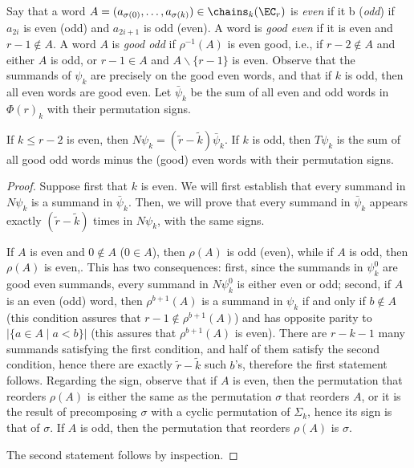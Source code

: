 Say that a word $A = (a_{\sigma(0)},\ldots,a_{\sigma(k)})\in \chains_k(\EC_r)$ is \emph{even} if it b (\emph{odd}) if $a_{2i}$ is even (odd) and $a_{2i+1}$ is odd (even). A word is \emph{good even} if it is even and $r-1\notin A$. A word $A$ is \emph{good odd} if $\rho^{-1}(A)$ is even good, i.e., if $r-2\notin A$ and either $A$ is odd, or $r-1\in A$ and $A\smallsetminus \{r-1\}$ is even. Observe that the summands of $\psi_k$ are precisely on the good even words, and that if $k$ is odd, then all even words are good even. Let $\bar{\psi}_k$ be the sum of all even and odd words in $\Phi(r)_k$ with their permutation signs.

\begin{lemma} \label{lemma:simp}
	If $k\leq r-2$ is even, then $N\psi_k = (\tilde{r}-\tilde{k})\bar{\psi}_k$. If $k$ is odd, then $T\psi_k$ is the sum of all good odd words minus the (good) even words with their permutation signs.
\end{lemma}

\begin{proof}
	Suppose first that $k$ is even. We will first establish that every summand in $N\psi_k$ is a summand in $\bar{\psi}_k$. Then, we will prove that every summand in $\bar{\psi}_k$ appears exactly $(\tilde{r}-\tilde{k})$ times in $N\psi_k$, with the same signs.

	If $A$ is even and $0\notin A$ ($0\in A$), then $\rho(A)$ is odd (even), while if $A$ is odd, then $\rho(A)$ is even,. This has two consequences: first, since the summands in $\psi_k^0$ are good even summands, every summand in $N\psi_k^0$ is either even or odd; second, if $A$ is an even (odd) word, then $\rho^{b+1}(A)$ is a summand in $\psi_k$ if and only if $b\notin A$ (this condition assures that $r-1\notin \rho^{b+1}(A)$) and has opposite parity to $|\{a\in A\mid a<b\}|$ (this assures that $\rho^{b+1}(A)$ is even). There are $r-k-1$ many summands satisfying the first condition, and half of them satisfy the second condition, hence there are exactly $\tilde{r}-\tilde{k}$ such $b$'s, therefore the first statement follows. Regarding the sign, observe that if $A$ is even, then the permutation that reorders $\rho(A)$ is either the same as the permutation $\sigma$ that reorders $A$, or it is the result of precomposing $\sigma$ with a cyclic permutation of $\Sigma_k$, hence its sign is that of $\sigma$. If $A$ is odd, then the permutation that reorders $\rho(A)$ is $\sigma$.

	The second statement follows by inspection.
\end{proof}

